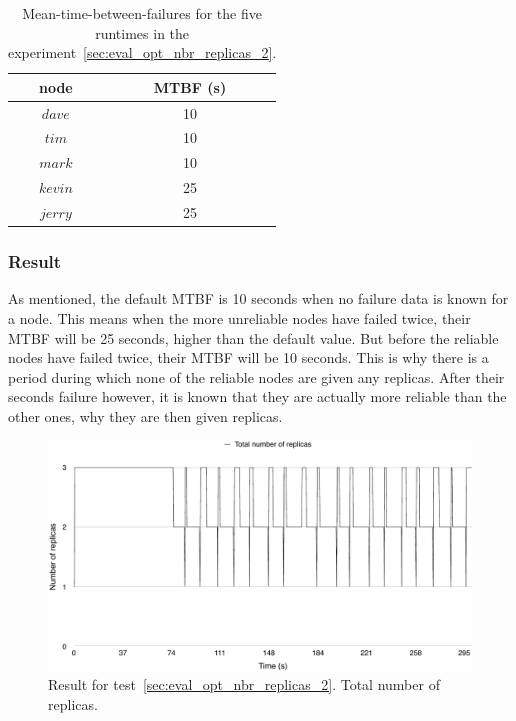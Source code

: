 \documentclass{cslthse-msc}
\begin{document}
\begin{table}[h]
	\begin{center}
	\begin{tabular}{| c | c |}
	 \hline
	 node & MTBF (s) \\
	 \hline		
	  $dave$ & 10 \\
	  $tim$ & 10 \\
	  $mark$ & 10 \\
	  $kevin$ & 25 \\
	  $jerry$ & 25 \\
	   \hline
	\end{tabular}
	 \caption{Mean-time-between-failures for the five runtimes in the experiment~\ref{sec:eval_opt_nbr_replicas_2}.}
	 \label{table:exp_nodes_means_2}
	 \end{center}
 \end{table}


\subsubsection*{Result}
As mentioned, the default MTBF is 10 seconds when no failure data is known for a node. This means when the more unreliable nodes have failed twice, their MTBF will be 25 seconds, higher than the default value. But before the reliable nodes have failed twice, their MTBF will be 10 seconds. This is why there is a period during which none of the reliable nodes are given any replicas. After their seconds failure however, it is known that they are actually more reliable than the other ones, why they are then given replicas.

\begin{figure}[!hbt]
\centering
\includegraphics[scale=0.5]{images/results/optimal_replicas/2/total.pdf}
\caption{Result for test~\ref{sec:eval_opt_nbr_replicas_2}. Total number of replicas.} \label{fig:exp_opt_replicas_total_2}
\end{figure}
\end{document}
